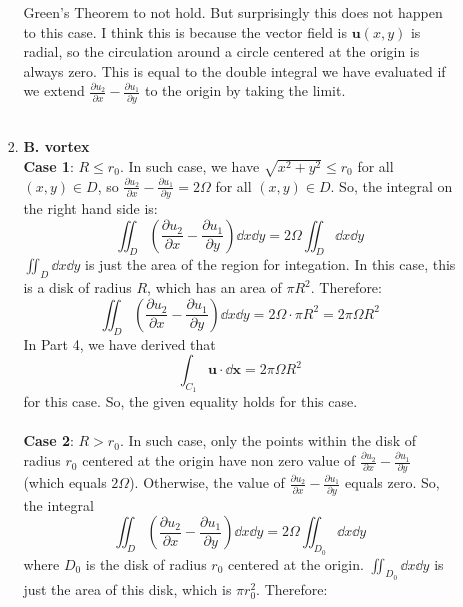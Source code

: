 \documentclass{article}
\begin{document}
\begin{enumerate}
\begin{enumerate}
\begin{enumerate}
    Green's Theorem to not hold. But surprisingly this does not happen to this case. I think this is because the vector field is
    \(\mathbf{u}(x,y)\) is radial, so the circulation around a circle centered at the origin is always zero. This is equal to the
    double integral we have evaluated if we extend \(\frac{\partial u_2}{\partial x} - \frac{\partial u_1}{\partial y}\) to the origin by taking the limit. \\
    \\
    \item \textbf{B. vortex}\\
    \textbf{Case 1}: \(R\le r_0\). In such case, we have \(\sqrt{x^2+y^2}\le r_0\) for all \((x,y)\in D\), so \(\frac{\partial u_2}{\partial x} - \frac{\partial u_1}{\partial y}=2\Omega\) for all \((x,y)\in D\). So, the integral on the right hand side is:
    \begin{equation}
      \iint_D \left(\frac{\partial u_2}{\partial x} - \frac{\partial u_1}{\partial y}\right) \dd x\dd y = 2\Omega\iint_D \dd x\dd y
    \end{equation}
    \(\iint_D \dd x\dd y\) is just the area of the region for integation. In this case, this is a disk of radius \(R\), which has an
    area of \(\pi R^2\). Therefore:
    \begin{equation}
      \iint_D \left(\frac{\partial u_2}{\partial x} - \frac{\partial u_1}{\partial y}\right) \dd x\dd y = 2\Omega \cdot \pi R^2 = 2\pi \Omega R^2
    \end{equation}
    In Part 4, we have derived that
    \begin{equation*}
      \int_{C_1} \mathbf{u}\cdot \dd \mathbf{x} = 2\pi \Omega R^2
    \end{equation*}
    for this case. So, the given equality holds for this case.\\
    \\
    \textbf{Case 2}: \(R>r_0\). In such case, only the points within the disk of radius \(r_0\) centered at the origin have non zero value of
    \(\frac{\partial u_2}{\partial x} - \frac{\partial u_1}{\partial y}\) (which equals \(2\Omega\)). Otherwise, the
    value of \(\frac{\partial u_2}{\partial x} - \frac{\partial u_1}{\partial y}\) equals zero. So, the integral
    \begin{equation}
      \iint_D \left(\frac{\partial u_2}{\partial x} - \frac{\partial u_1}{\partial y}\right) \dd x\dd y = 2\Omega\iint_{D_0} \dd x\dd y
    \end{equation}
    where \(D_0\) is the disk of radius \(r_0\) centered at the origin. \(\iint_{D_0} \dd x\dd y\) is just the area of this disk, which is \(\pi r_0^2\). Therefore:

\end{enumerate}
\end{enumerate}
\end{enumerate}
\end{document}
